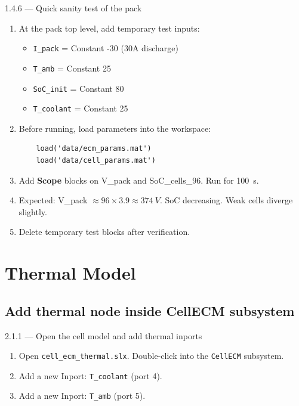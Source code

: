 \documentclass[11pt,a4paper]{article}
\begin{document}
\begin{guistep}{1.4.6 — Quick sanity test of the pack}
\begin{enumerate}
    \item At the pack top level, add temporary test inputs:
    \begin{itemize}
        \item \texttt{I\_pack} = Constant -30 (30A discharge)
        \item \texttt{T\_amb} = Constant 25
        \item \texttt{SoC\_init} = Constant 80
        \item \texttt{T\_coolant} = Constant 25
    \end{itemize}
    \item Before running, load parameters into the workspace:
    \begin{verbatim}
    load('data/ecm_params.mat')
    load('data/cell_params.mat')
    \end{verbatim}
    \item Add \textbf{Scope} blocks on V\_pack and SoC\_cells\_96. Run for 100~s.
    \item Expected: V\_pack $\approx 96 \times 3.9 \approx \SI{374}{V}$. SoC decreasing. Weak cells diverge slightly.
    \item Delete temporary test blocks after verification.
\end{enumerate}
\end{guistep}


\newpage
\section{Thermal Model}

\subsection{Add thermal node inside CellECM subsystem}

\begin{guistep}{2.1.1 — Open the cell model and add thermal inports}
\begin{enumerate}
    \item Open \texttt{cell\_ecm\_thermal.slx}. Double-click into the \texttt{CellECM} subsystem.
    \item Add a new Inport: \texttt{T\_coolant} (port 4).
    \item Add a new Inport: \texttt{T\_amb} (port 5).
\end{enumerate}
\end{guistep}
\end{document}
